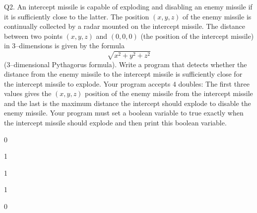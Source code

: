 Q2. An intercept missile is capable of exploding and disabling an enemy missile if
it is sufficiently close to the latter. The position $(x,y,z)$ of the enemy
missile is continually collected by a radar mounted on the intercept missile.
The distance between two points $(x,y,z)$ and $(0,0,0)$ (the position of the
intercept missile) in $3$--dimensions is given by the formula
\[\sqrt{x^2 + y^2 + z^2}\]
($3$--dimensional Pythagorus formula). Write a program that detects whether the
distance from the enemy missile to the intercept missile is sufficiently close
for the intercept missile to explode. Your program accepts $4$ doubles: The
first three values gives the $(x,y,z)$ position of the enemy missile from the
intercept missile and the last is the maximum distance the intercept should
explode to disable the enemy missile. Your program must set a boolean variable
to true exactly when the intercept missile should explode and then print this
boolean variable.

\resett
\nextt
\begin{console}[commandchars=\\\{\}]
0
\end{console}

\nextt
\begin{console}[commandchars=\\\{\}]
1
\end{console}

\nextt
\begin{console}[commandchars=\\\{\}]
1
\end{console}

\nextt
\begin{console}[commandchars=\\\{\}]
1
\end{console}

\nextt
\begin{console}[commandchars=\\\{\}]
0
\end{console}
